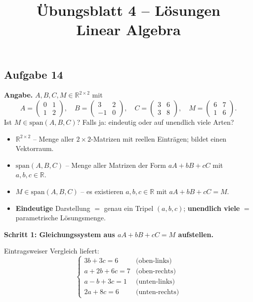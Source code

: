 \documentclass[a4paper,12pt]{article}
\title{\"Ubungsblatt 4 -- L\"osungen \\ \large Linear Algebra}
\author{}
\date{}
\begin{document}
\maketitle

\subsection*{Aufgabe 14}

\textbf{Angabe.} $A, B, C, M \in \mathbb{R}^{2 \times 2}$ mit
\[
A = \begin{pmatrix} 0 & 1 \\ 1 & 2 \end{pmatrix},\quad
B = \begin{pmatrix} 3 & 2 \\ -1 & 0 \end{pmatrix},\quad
C = \begin{pmatrix} 3 & 6 \\ 3 & 8 \end{pmatrix},\quad
M = \begin{pmatrix} 6 & 7 \\ 1 & 6 \end{pmatrix}.
\]
Ist $M \in \text{span}(A,B,C)$? Falls ja: eindeutig oder auf unendlich viele Arten?

\begin{begriffe}
\begin{itemize}[leftmargin=*, nosep]
    \item $\mathbb{R}^{2 \times 2}$ -- Menge aller $2 \times 2$-Matrizen mit reellen Eintr\"agen; bildet einen Vektorraum.
    \item $\text{span}(A,B,C)$ -- Menge aller Matrizen der Form $aA + bB + cC$ mit $a,b,c \in \mathbb{R}$.
    \item $M \in \text{span}(A,B,C)$ -- es existieren $a,b,c \in \mathbb{R}$ mit $aA + bB + cC = M$.
    \item \textbf{Eindeutige} Darstellung $=$ genau ein Tripel $(a,b,c)$; \textbf{unendlich viele} $=$ parametrische L\"osungsmenge.
\end{itemize}
\end{begriffe}

\medskip

\textbf{Schritt 1: Gleichungssystem aus $aA + bB + cC = M$ aufstellen.}

Eintragsweiser Vergleich liefert:
\[
\begin{cases}
3b + 3c = 6 & \text{(oben-links)} \\
a + 2b + 6c = 7 & \text{(oben-rechts)} \\
a - b + 3c = 1 & \text{(unten-links)} \\
2a + 8c = 6 & \text{(unten-rechts)}
\end{cases}
\]
\end{document}
